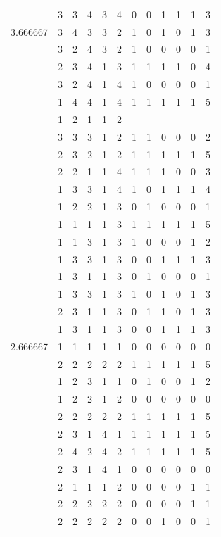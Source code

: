 \documentclass[]{book}
\theoremstyle{definition}
\theoremstyle{definition}
\theoremstyle{definition}
\theoremstyle{remark}
\begin{document}
\begin{table}
{\begin{tabular}[t]{rrrrrrrrrrrr}
 & 3 & 3 & 4 & 3 & 4 & 0 & 0 & 1 & 1 & 1 & 3\\
3.666667 & 3 & 4 & 3 & 3 & 2 & 1 & 0 & 1 & 0 & 1 & 3\\
 & 3 & 2 & 4 & 3 & 2 & 1 & 0 & 0 & 0 & 0 & 1\\
 & 2 & 3 & 4 & 1 & 3 & 1 & 1 & 1 & 1 & 0 & 4\\
 & 3 & 2 & 4 & 1 & 4 & 1 & 0 & 0 & 0 & 0 & 1\\
 & 1 & 4 & 4 & 1 & 4 & 1 & 1 & 1 & 1 & 1 & 5\\
 & 1 & 2 & 1 & 1 & 2 &  &  &  &  &  & \\
 & 3 & 3 & 3 & 1 & 2 & 1 & 1 & 0 & 0 & 0 & 2\\
 & 2 & 3 & 2 & 1 & 2 & 1 & 1 & 1 & 1 & 1 & 5\\
 & 2 & 2 & 1 & 1 & 4 & 1 & 1 & 1 & 0 & 0 & 3\\
 & 1 & 3 & 3 & 1 & 4 & 1 & 0 & 1 & 1 & 1 & 4\\
 & 1 & 2 & 2 & 1 & 3 & 0 & 1 & 0 & 0 & 0 & 1\\
 & 1 & 1 & 1 & 1 & 3 & 1 & 1 & 1 & 1 & 1 & 5\\
 & 1 & 1 & 3 & 1 & 3 & 1 & 0 & 0 & 0 & 1 & 2\\
 & 1 & 3 & 3 & 1 & 3 & 0 & 0 & 1 & 1 & 1 & 3\\
 & 1 & 3 & 1 & 1 & 3 & 0 & 1 & 0 & 0 & 0 & 1\\
 & 1 & 3 & 3 & 1 & 3 & 1 & 0 & 1 & 0 & 1 & 3\\
 & 2 & 3 & 1 & 1 & 3 & 0 & 1 & 1 & 0 & 1 & 3\\
 & 1 & 3 & 1 & 1 & 3 & 0 & 0 & 1 & 1 & 1 & 3\\
2.666667 & 1 & 1 & 1 & 1 & 1 & 0 & 0 & 0 & 0 & 0 & 0\\
 & 2 & 2 & 2 & 2 & 2 & 1 & 1 & 1 & 1 & 1 & 5\\
 & 1 & 2 & 3 & 1 & 1 & 0 & 1 & 0 & 0 & 1 & 2\\
 & 1 & 2 & 2 & 1 & 2 & 0 & 0 & 0 & 0 & 0 & 0\\
 & 2 & 2 & 2 & 2 & 2 & 1 & 1 & 1 & 1 & 1 & 5\\
 & 2 & 3 & 1 & 4 & 1 & 1 & 1 & 1 & 1 & 1 & 5\\
 & 2 & 4 & 2 & 4 & 2 & 1 & 1 & 1 & 1 & 1 & 5\\
 & 2 & 3 & 1 & 4 & 1 & 0 & 0 & 0 & 0 & 0 & 0\\
 & 2 & 1 & 1 & 1 & 2 & 0 & 0 & 0 & 0 & 1 & 1\\
 & 2 & 2 & 2 & 2 & 2 & 0 & 0 & 0 & 0 & 1 & 1\\
 & 2 & 2 & 2 & 2 & 2 & 0 & 0 & 1 & 0 & 0 & 1\\

\end{tabular}}
\end{table}
\end{document}
